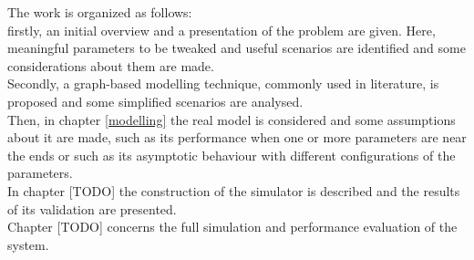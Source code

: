 The work is organized as follows:\\
firstly, an initial overview and a presentation of the problem are given. Here, meaningful parameters to be tweaked and useful scenarios are identified and some considerations about them are made.\\
Secondly, a graph-based modelling technique, commonly used in literature, is proposed and some simplified scenarios are analysed.\\
Then, in chapter \ref{modelling} the real model is considered and some assumptions about it are made, such as its performance when one or more parameters are near the ends or such as its asymptotic behaviour with different configurations of the parameters.\\
In chapter [TODO] the construction of the simulator is described and the results of its validation are presented.\\
Chapter [TODO] concerns the full simulation and performance evaluation of the system.

